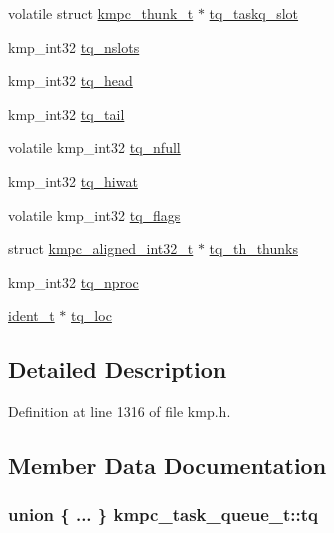 \begin{DoxyCompactItemize}
\item 
volatile struct \hyperlink{structkmpc__thunk__t}{kmpc\-\_\-thunk\-\_\-t} $\ast$ \hyperlink{structkmpc__task__queue__t_a65ea724ea74e733bbae58fd1bb7511a6}{tq\-\_\-taskq\-\_\-slot}
\item 
kmp\-\_\-int32 \hyperlink{structkmpc__task__queue__t_ad2fe4fa78d80aad0000f62780a68f84b}{tq\-\_\-nslots}
\item 
kmp\-\_\-int32 \hyperlink{structkmpc__task__queue__t_a592b2cd324a0ce601c5cc875ccf2ed51}{tq\-\_\-head}
\item 
kmp\-\_\-int32 \hyperlink{structkmpc__task__queue__t_a9cabfcfff0691551b1b82ac45e3491c6}{tq\-\_\-tail}
\item 
volatile kmp\-\_\-int32 \hyperlink{structkmpc__task__queue__t_a44546f52b8cb3b1ab9f0819b3a2aacff}{tq\-\_\-nfull}
\item 
kmp\-\_\-int32 \hyperlink{structkmpc__task__queue__t_aeda8f2eb9c68ba154a41c7c839473fec}{tq\-\_\-hiwat}
\item 
volatile kmp\-\_\-int32 \hyperlink{structkmpc__task__queue__t_aa9d9f58c9c437c40f115139fd3e39ef3}{tq\-\_\-flags}
\item 
struct \hyperlink{structkmpc__aligned__int32__t}{kmpc\-\_\-aligned\-\_\-int32\-\_\-t} $\ast$ \hyperlink{structkmpc__task__queue__t_a71cbb7d720973aa2790fbafec688046a}{tq\-\_\-th\-\_\-thunks}
\item 
kmp\-\_\-int32 \hyperlink{structkmpc__task__queue__t_af80c168362026e7d13bbbe9fbf1389b7}{tq\-\_\-nproc}
\item 
\hyperlink{group__BASIC__TYPES_ga690fda6b92f039a72db263c6b4394ddb}{ident\-\_\-t} $\ast$ \hyperlink{structkmpc__task__queue__t_aea2c340b635e160e01da0567adaf247d}{tq\-\_\-loc}
\end{DoxyCompactItemize}


\subsection{Detailed Description}


Definition at line 1316 of file kmp.\-h.



\subsection{Member Data Documentation}
\hypertarget{structkmpc__task__queue__t_a553762c08b35b448cda7d34f5f6047c7}{
\subsubsection[{tq}]{\setlength{\rightskip}{0pt plus 5cm}union \{ ... \}   kmpc\-\_\-task\-\_\-queue\-\_\-t\-::tq}}\label{structkmpc__task__queue__t_a553762c08b35b448cda7d34f5f6047c7}


